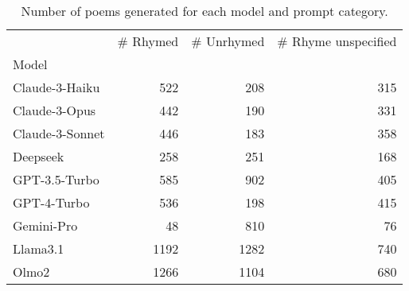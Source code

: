 \begin{table}[H]
  \centering
  \small
  \singlespacing
  \begin{tabular}{lrrr}
  \toprule
   & \# Rhymed & \# Unrhymed & \# Rhyme unspecified \\
  Model &  &  &  \\
  \midrule
  Claude-3-Haiku & 522 & 208 & 315 \\
  Claude-3-Opus & 442 & 190 & 331 \\
  Claude-3-Sonnet & 446 & 183 & 358 \\
  Deepseek & 258 & 251 & 168 \\
  GPT-3.5-Turbo & 585 & 902 & 405 \\
  GPT-4-Turbo & 536 & 198 & 415 \\
  Gemini-Pro & 48 & 810 & 76 \\
  Llama3.1 & 1192 & 1282 & 740 \\
  Olmo2 & 1266 & 1104 & 680 \\
  \bottomrule
  \end{tabular}
  \caption{Number of poems generated for each model and prompt category.}
  \label{tab:num_poems_models}
\end{table}